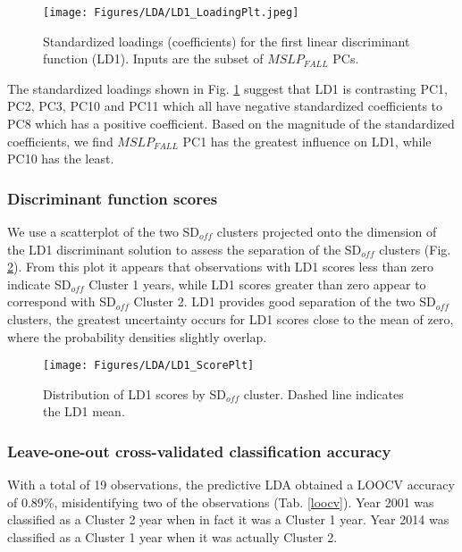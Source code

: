 \documentclass{tATO2e}
\newcommand{\sdoff}{SD$_{off}$}
\begin{document}
\begin{figure}
	\begin{center}
		\texttt{[image: Figures/LDA/LD1\_LoadingPlt.jpeg]}
		\caption{Standardized loadings (coefficients) for the first linear discriminant function (LD1). Inputs are the subset of $MSLP_{FALL}$ PCs.}
		\label{fig:loadingplot}
	\end{center}
\end{figure}

The standardized loadings shown in Fig. \ref{fig:loadingplot} suggest that LD1 is contrasting PC1, PC2, PC3, PC10 and PC11 which all have negative standardized coefficients to PC8 which has a positive coefficient. Based on the magnitude of the standardized coefficients, we find $MSLP_{FALL}$ PC1 has the greatest influence on LD1, while PC10 has the least. 


\subsubsection{Discriminant function scores}
We use a scatterplot of the two \sdoff{} clusters projected onto the dimension of the LD1 discriminant
solution to assess the separation of the \sdoff{} clusters (Fig. \ref{fig:ld1_scoreplot}). From this plot it appears that observations with LD1 scores less than zero indicate \sdoff{} Cluster 1 years, while LD1 scores greater than zero appear to correspond with \sdoff{} Cluster 2. LD1 provides good separation of the two \sdoff{} clusters, the greatest uncertainty occurs for LD1 scores close to the mean of zero, where the probability densities slightly overlap.  

\begin{figure}
	\begin{center}
		\texttt{[image: Figures/LDA/LD1\_ScorePlt]}
		\caption{Distribution of LD1 scores by \sdoff{} cluster. Dashed line indicates the LD1 mean.}
		\label{fig:ld1_scoreplot}
	\end{center}
\end{figure}





\subsubsection{Leave-one-out cross-validated classification accuracy}
 With a total of 19 observations, the predictive LDA obtained a LOOCV accuracy of 0.89\%, misidentifying two of the observations (Tab. \ref{loocv}). Year 2001 was classified as a Cluster 2 year when in fact it was a Cluster 1 year. Year 2014 was classified as a Cluster 1 year when it was actually Cluster 2. 
\end{document}
